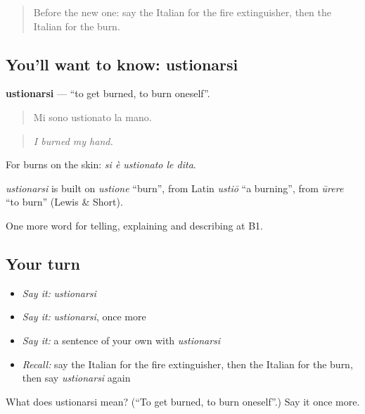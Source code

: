 \label{lesson:IT-C302-ustionarsi}



\begin{quote}
Before the new one: say the Italian for the fire extinguisher, then the Italian for the burn.
\end{quote}

\subsection*{You'll want to know: ustionarsi}
\textbf{ustionarsi} — \textquotedblleft{}to get burned, to burn oneself\textquotedblright{}.

\begin{quote}
Mi sono ustionato la mano.
\end{quote}

\begin{quote}
\emph{I burned my hand.}
\end{quote}

For burns on the skin: \emph{si è ustionato le dita}.

\begin{cousinweb}
\emph{ustionarsi} is built on \emph{ustione} \textquotedblleft{}burn\textquotedblright{}, from Latin \emph{ustiō} \textquotedblleft{}a burning\textquotedblright{}, from \emph{ūrere} \textquotedblleft{}to burn\textquotedblright{} (Lewis \& Short).
\end{cousinweb}

\begin{grammarlens}[title={What you've built}]
One more word for telling, explaining and describing at B1.
\end{grammarlens}

\subsection*{Your turn}
\begin{itemize}
\raggedright
  \item \emph{Say it:} \emph{ustionarsi}
  \item \emph{Say it:} \emph{ustionarsi}, once more
  \item \emph{Say it:} a sentence of your own with \emph{ustionarsi}
  \item \emph{Recall:} say the Italian for the fire extinguisher, then the Italian for the burn, then say \emph{ustionarsi} again
\end{itemize}

\begin{tcolorbox}[breakable,colback=teal!4,colframe=teal!35!black,title={Before you move on}]
What does ustionarsi mean? (\textquotedblleft{}To get burned, to burn oneself\textquotedblright{}.) Say it once more.
\end{tcolorbox}
